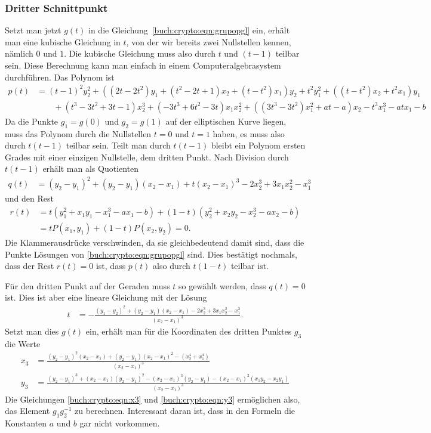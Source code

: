 \subsubsection{Dritter Schnittpunkt}
Setzt man jetzt $g(t)$ in die Gleichung~\eqref{buch:crypto:eqn:grupopgl}
ein, erhält man eine kubische
Gleichung in $t$, von der wir bereits zwei Nullstellen kennen, nämlich 
$0$ und $1$.
Die kubische Gleichung muss also durch $t$ und $(t-1)$ teilbar sein.
Diese Berechnung kann man einfach in einem Computeralgebrasystem
durchführen.
Das Polynom ist
\begin{align*}
p(t)
&=
(t-1)^2y_2^2
+
((2t-2t^2) y_1 +(t^2-2t+1)x_2 + (t-t^2)x_1)y_2
+
t^2y_1^2
+
((t-t^2)x_2+t^2 x_1)y_1
\\
&\qquad
+
(t^3-3t^2+3t-1)x_2^3
+
(-3 t^3+6t^2-3t)x_1x_2^2
+
((3t^3-3t^2)x_1^2+at-a)x_2
-
t^3x_1^3
-
atx_1-b
\end{align*}
Da die Punkte $g_1=g(0)$ und $g_2=g(1)$ auf der elliptischen Kurve
liegen, muss das Polynom durch die Nullstellen $t=0$ und $t=1$
haben, es muss also durch $t(t-1)$ teilbar sein.
Teilt man durch $t(t-1)$ bleibt ein Polynom ersten Grades mit
einer einzigen Nullstelle, dem dritten Punkt.
Nach Division durch $t(t-1)$ erhält man als Quotienten
\begin{align}
q(t)
&=
(y_2-y_1)^2 
+
(y_2-y_1) (x_2-x_1)
+
t(x_2-x_1)^3
-
2x_2^3+3x_1x_2^2-x_1^3
\label{buch:ecc:eqn:q(t)}
\end{align}
und den Rest
\begin{align*}
r(t)
&=
t(y_1^2+x_1y_1-x_1^3-ax_1-b)
+
(1-t)(y_2^2+x_2y_2-x_2^3-ax_2-b)
\\
&=
tP(x_1,y_1)
+
(1-t)P(x_2,y_2)
=
0.
\end{align*}
Die Klammerausdrücke verschwinden, da sie gleichbedeutend damit sind,
dass die Punkte Lösungen von \eqref{buch:crypto:eqn:grupopgl} sind.
Dies bestätigt nochmals, dass der Rest $r(t)=0$ ist, dass $p(t)$
also durch $t(1-t)$ teilbar ist.

Für den dritten Punkt auf der Geraden muss $t$ so gewählt werden, dass
$q(t)=0$ ist.
Dies ist aber eine lineare Gleichung mit der Lösung
\begin{align*}
t
&=
-\frac{
(y_1-y_2)^2
+
(y_2-y_1)(x_2-x_1)
-2x_2^3+3x_1x_2^2-x_1^3
}{(x_2-x_1)^3}
.
\end{align*}
Setzt man dies $g(t)$ ein, erhält man für die Koordinaten des dritten
Punktes $g_3$ die Werte
\begin{align}
x_3
&=
\frac{
(y_2-y_1)^2(x_2-x_1) + (y_2-y_1)(x_2-x_1)^2
-(x_2^4+x_1^4)
}{
(x_2-x_1)^3
}
\label{buch:crypto:eqn:x3}
\\
y_3
&=
\frac{
(y_2-y_1)^3
+(x_2-x_1)(y_2-y_1)^2
-(x_{2}-x_{1})^3 ( y_{2} - y_{1})
-(x_{2}-x_{1})^2 ( x_{1} y_{2}- x_{2} y_{1})
}{
(x_2-x_1)^3
}
\label{buch:crypto:eqn:y3}
\end{align}
Die Gleichungen 
\eqref{buch:crypto:eqn:x3}
und
\eqref{buch:crypto:eqn:y3}
ermöglichen also, das Element $g_1g_2^{-1}$ zu berechnen.
Interessant daran ist, dass in den Formeln die Konstanten $a$ und $b$ 
gar nicht vorkommen.

